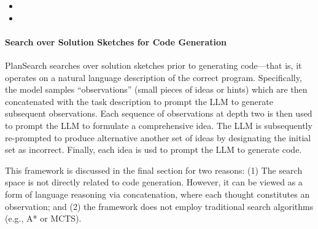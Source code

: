 \begin{itemize}
    \item {}
    \item {}
\end{itemize}

\paragraph{Search over Solution Sketches for Code Generation}  
PlanSearch \citep{wang2025planning} searches over solution sketches prior to generating code—that is, it operates on a natural language description of the correct program. Specifically, the model samples ``observations'' (small pieces of ideas or hints) which are then concatenated with the task description to prompt the LLM to generate subsequent observations.
Each sequence of observations at depth two is then used to prompt the LLM to formulate a comprehensive idea. The LLM is subsequently re-prompted to produce alternative another set of ideas by designating the initial set as incorrect. Finally, each idea is usd to prompt the LLM to generate code. 

This framework is discussed in the final section for two reasons: (1) The search space is not directly related to code generation. However, it can be viewed as a form of language reasoning via concatenation, where each thought constitutes an observation; and (2) the framework does not employ traditional search algorithms (e.g., A* or MCTS).
